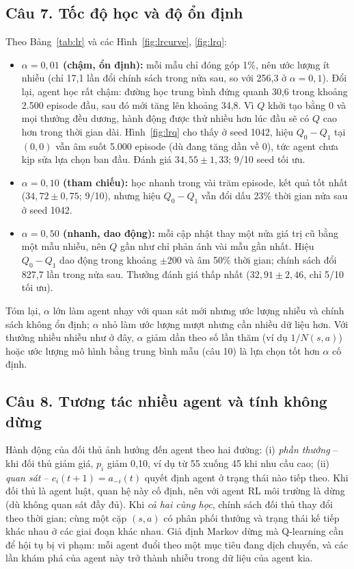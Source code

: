 \documentclass[12pt,a4paper]{report}
\begin{document}
\subsection*{Câu 7. Tốc độ học và độ ổn định}
Theo Bảng~\ref{tab:lr} và các Hình~\ref{fig:lrcurve}, \ref{fig:lrq}:
\begin{itemize}
\item \textbf{$\alpha=0{,}01$ (chậm, ổn định):} mỗi mẫu chỉ đóng góp 1\%, nên ước
  lượng ít nhiễu (chỉ 17{,}1 lần đổi chính sách trong nửa sau, so với 256{,}3 ở
  $\alpha=0{,}1$). Đổi lại, agent học rất chậm: đường học trung bình đứng quanh 30{,}6
  trong khoảng 2.500 episode đầu, sau đó mới tăng lên khoảng 34{,}8. Vì $Q$ khởi tạo
  bằng 0 và mọi thưởng đều dương, hành động được thử nhiều hơn lúc đầu sẽ có $Q$ cao
  hơn trong thời gian dài. Hình~\ref{fig:lrq} cho thấy ở seed 1042, hiệu
  $Q_0-Q_1$ tại $(0,0)$ vẫn âm suốt 5.000 episode (dù đang tăng dần về 0), tức agent
  chưa kịp sửa lựa chọn ban đầu. Đánh giá $34{,}55\pm1{,}33$; 9/10 seed tối ưu.
\item \textbf{$\alpha=0{,}10$ (tham chiếu):} học nhanh trong vài trăm episode, kết quả
  tốt nhất ($34{,}72\pm0{,}75$; 9/10), nhưng hiệu $Q_0-Q_1$ vẫn đổi dấu 23\% thời
  gian nửa sau ở seed 1042.
\item \textbf{$\alpha=0{,}50$ (nhanh, dao động):} mỗi cập nhật thay một nửa giá trị
  cũ bằng một mẫu nhiễu, nên $Q$ gần như chỉ phản ánh vài mẫu gần nhất. Hiệu
  $Q_0-Q_1$ dao động trong khoảng $\pm200$ và âm 50\% thời gian; chính sách đổi 827{,}7
  lần trong nửa sau. Thưởng đánh giá thấp nhất ($32{,}91\pm2{,}46$, chỉ 5/10 tối ưu).
\end{itemize}
Tóm lại, $\alpha$ lớn làm agent nhạy với quan sát mới nhưng ước lượng nhiễu và chính
sách không ổn định; $\alpha$ nhỏ làm ước lượng mượt nhưng cần nhiều dữ liệu hơn.
Với thưởng nhiều nhiễu như ở đây, $\alpha$ giảm dần theo số lần thăm (ví dụ
$1/N(s,a)$) hoặc ước lượng mô hình bằng trung bình mẫu (câu 10) là lựa chọn tốt hơn
$\alpha$ cố định.

\subsection*{Câu 8. Tương tác nhiều agent và tính không dừng}
Hành động của đối thủ ảnh hưởng đến agent theo hai đường: (i) \emph{phần thưởng} --
khi đối thủ giảm giá, $p_i$ giảm 0{,}10, ví dụ từ 55 xuống 45 khi nhu cầu cao;
(ii) \emph{quan sát} -- $c_i(t+1)=a_{-i}(t)$ quyết định agent ở trạng thái nào tiếp
theo. Khi đối thủ là agent luật, quan hệ này cố định, nên với agent RL môi trường
là dừng (dù không quan sát đầy đủ). Khi \emph{cả hai cùng học}, chính sách đối thủ
thay đổi theo thời gian; cùng một cặp $(s,a)$ có phân phối thưởng và trạng thái kế
tiếp khác nhau ở các giai đoạn khác nhau. Giả định Markov dừng mà Q-learning cần để
hội tụ bị vi phạm: mỗi agent đuổi theo một mục tiêu đang dịch chuyển, và các lần
khám phá của agent này trở thành nhiễu trong dữ liệu của agent kia.
\end{document}
